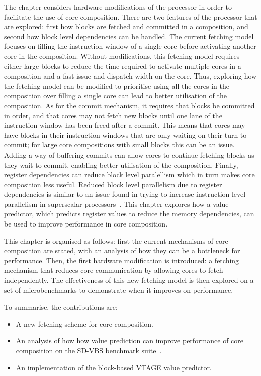 The chapter considers hardware modifications of the processor in order to facilitate the use of core composition.
There are two features of the processor that are explored: first how blocks are fetched and committed in a composition, and second how block level dependencies can be handled.
The current fetching model focuses on filling the instruction window of a single core before activating another core in the composition.
Without modifications, this fetching model requires either large blocks to reduce the time required to activate multiple cores in a composition and a fast issue and dispatch width on the core.
Thus, exploring how the fetching model can be modified to prioritise using all the cores in the composition over filling a single core can lead to better utilisation of the composition.
As for the commit mechanism, it requires that blocks be committed in order, and that cores may not fetch new blocks until one lane of the instruction window has been freed after a commit.
This means that cores may have blocks in their instruction windows that are only waiting on their turn to commit; for large core compositions with small blocks this can be an issue.
Adding a way of buffering commits can allow cores to continue fetching blocks as they wait to commit, enabling better utilisation of the composition. 
Finally, register dependencies can reduce block level paralellism which in turn makes core composition less useful.
Reduced block level parallelism due to register dependencies is similar to an issue found in trying to increase instruction level parallelism in superscalar processors~\cite{peraisBeBop2015}.
This chapter explores how a value predictor, which predicts register values to reduce the memory dependencies, can be used to improve performance in core composition.

This chapter is organised as follows: first the current mechanisms of core composition are stated, with an analysis of how they can be a bottleneck for performance.
Then, the first hardware modification is introduced: a fetching mechanism that reduces core communication by allowing cores to fetch independently.
The effectiveness of this new fetching model is then explored on a set of microbenchmarks to demonstrate when it improves on performance.


To summarise, the contributions are:

\begin{itemize}
\item A new fetching scheme for core composition.
\item An analysis of how how value prediction can improve performance of core composition on the SD-VBS benchmark suite~\cite{sdvbs}.
\item An implementation of the block-based VTAGE value predictor.
\end{itemize}